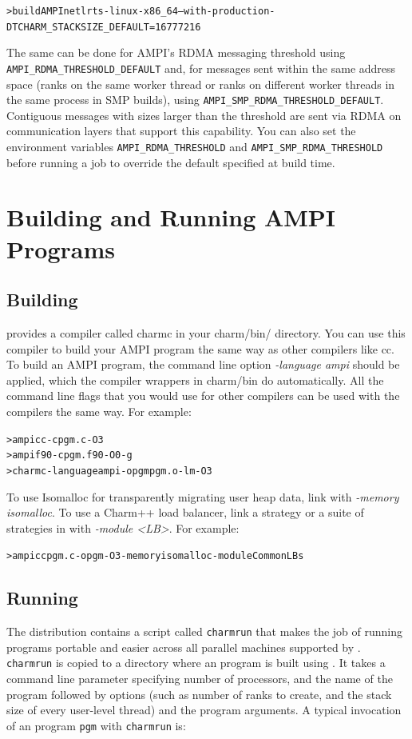 \documentclass[10pt]{article}
\begin{document}
\begin{alltt}
> build AMPI netlrts-linux-x86_64 --with-production -DTCHARM_STACKSIZE_DEFAULT=16777216
\end{alltt}

The same can be done for AMPI's RDMA messaging threshold using \texttt{AMPI\_RDMA\_THRESHOLD\_DEFAULT} and,
for messages sent within the same address space (ranks on the same worker thread or ranks
on different worker threads in the same process in SMP builds), using \texttt{AMPI\_SMP\_RDMA\_THRESHOLD\_DEFAULT}.
Contiguous messages with sizes larger than the threshold are sent via RDMA on communication layers that
support this capability. You can also set the environment variables \texttt{AMPI\_RDMA\_THRESHOLD} and \texttt{AMPI\_SMP\_RDMA\_THRESHOLD}
before running a job to override the default specified at build time.

\section{Building and Running AMPI Programs}
\subsection{Building}
\charmpp{} provides a compiler called charmc in your charm/bin/ directory.
You can use this compiler to build your AMPI program the same way as other
compilers like cc. To build an AMPI program, the command line option
\emph{-language ampi} should be applied, which the \ampi{} compiler wrappers
in charm/bin do automatically. All the command line flags that you would use
for other compilers can be used with the \ampi{} compilers the same way.
For example:

\begin{alltt}
> ampicc -c pgm.c -O3
> ampif90 -c pgm.f90 -O0 -g
> charmc -language ampi -o pgm pgm.o -lm -O3 
\end{alltt}

To use Isomalloc for transparently migrating user heap data, link with
\emph{-memory isomalloc}. To use a Charm++ load balancer, link a strategy
or a suite of strategies in with \emph{-module \textless LB\textgreater}. For example:

\begin{alltt}
> ampicc pgm.c -o pgm -O3 -memory isomalloc -module CommonLBs
\end{alltt}


\subsection{Running}
The \charmpp{} distribution contains a script called \texttt{charmrun} that
makes the job of running \ampi{} programs portable and easier across all
parallel machines supported by \charmpp{}. \texttt{charmrun} is copied to a
directory where an \ampi{} program is built using \charmc{}. It takes a command
line parameter specifying number of processors, and the name of the program
followed by \ampi{} options (such as number of ranks to create, and the stack size
of every user-level thread) and the program arguments. A typical invocation of an \ampi{}
program \texttt{pgm} with \texttt{charmrun} is:
\end{document}
